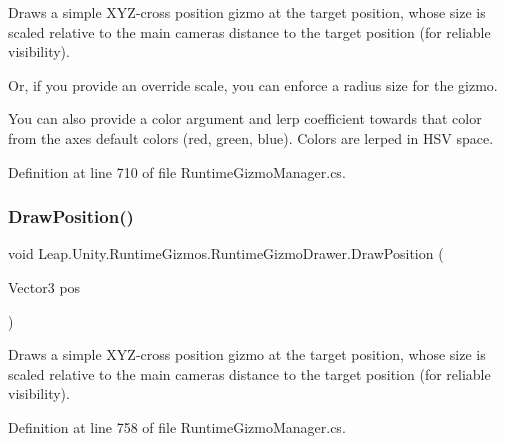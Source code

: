 Draws a simple X\+Y\+Z-\/cross position gizmo at the target position, whose size is scaled relative to the main camera\textquotesingle{}s distance to the target position (for reliable visibility). 

Or, if you provide an override scale, you can enforce a radius size for the gizmo.

You can also provide a color argument and lerp coefficient towards that color from the axes\textquotesingle{} default colors (red, green, blue). Colors are lerped in H\+SV space. 

Definition at line 710 of file Runtime\+Gizmo\+Manager.\+cs.

\mbox{\label{class_leap_1_1_unity_1_1_runtime_gizmos_1_1_runtime_gizmo_drawer_a16125428988c795ef3da1b83af7dc63d}} 
\subsubsection{\texorpdfstring{DrawPosition()}{DrawPosition()}\hspace{0.1cm}{\footnotesize\ttfamily [2/3]}}
{\footnotesize\ttfamily void Leap.\+Unity.\+Runtime\+Gizmos.\+Runtime\+Gizmo\+Drawer.\+Draw\+Position (\begin{DoxyParamCaption}\item[{Vector3}]{pos }\end{DoxyParamCaption})}



Draws a simple X\+Y\+Z-\/cross position gizmo at the target position, whose size is scaled relative to the main camera\textquotesingle{}s distance to the target position (for reliable visibility). 



Definition at line 758 of file Runtime\+Gizmo\+Manager.\+cs.

\mbox{\label{class_leap_1_1_unity_1_1_runtime_gizmos_1_1_runtime_gizmo_drawer_a6902f972fcd982162b60aee63490fecc}} 
